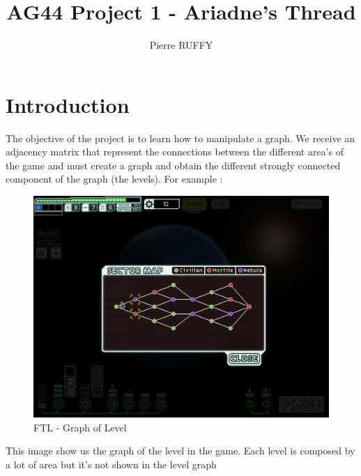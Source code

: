 \documentclass[a4paper,8pt]{article}
\title{AG44 Project 1 - Ariadne's Thread}
\author{Pierre RUFFY}
\begin{document}
\maketitle

\section{Introduction}
The objective of the project is to learn how to manipulate a graph. We receive an adjacency matrix that represent the connections between the different 
area's of the game and must create a graph and obtain the different strongly connected component of the graph (the levels). For example :

\begin{figure}[h]
\centering
 \includegraphics[scale=0.1]{ftl-mapoflevel.png}
\caption{FTL - Graph of Level}
\end{figure}

This image show us the graph of the level in the game. Each level is composed by a lot of area but it's not shown in the level graph\\
\end{document}
